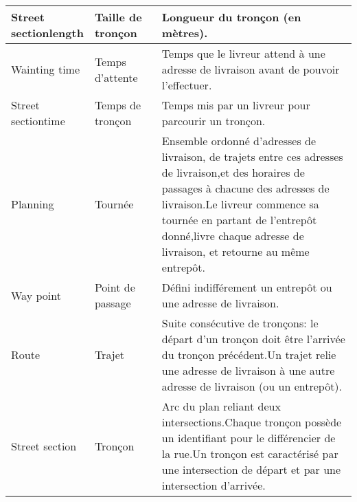 \begin{table}[]
\begin{longtable}{|p{0.2\linewidth}|p{0.2\linewidth}|p{0.6\linewidth}|}
Street sectionlength                        & Taille de tronçon              & Longueur du tronçon (en mètres).                                                                                                                                                                                                                                                    \\ \hline
Wainting time                               & Temps d'attente                & Temps que le livreur attend à une adresse de livraison avant de pouvoir l'effectuer.                                                                                                                                                                                                \\ \hline
Street sectiontime                          & Temps de tronçon               & Temps mis par un livreur pour parcourir un tronçon.                                                                                                                                                                                                                                 \\ \hline
Planning                                    & Tournée                        & Ensemble ordonné d'adresses de livraison, de trajets entre ces adresses de livraison,et des horaires de passages à chacune des adresses de livraison.Le livreur commence sa tournée en partant de l'entrepôt donné,livre chaque adresse de livraison, et retourne au même entrepôt. \\ \hline
Way point                                   & Point de passage               & Défini indifférement un entrepôt ou une adresse de livraison.                                                                                                                                                                                                                       \\ \hline
Route                                       & Trajet                         & Suite consécutive de tronçons: le départ d'un tronçon doit être l'arrivée du tronçon précédent.Un trajet relie une adresse de livraison à une autre adresse de livraison (ou un entrepôt).                                                                                          \\ \hline
Street section                              & Tronçon                        & Arc du plan reliant deux intersections.Chaque tronçon possède un identifiant pour le différencier de la rue.Un tronçon est caractérisé par une intersection de départ et par une intersection d'arrivée.                                                                            \\ \hline

\end{longtable}
\end{table}
